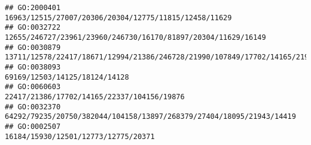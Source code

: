 \documentclass[
]{article}
\begin{document}
\begin{verbatim}
## GO:2000401                                                                                                                                                                                                                                                                                                                                                        16963/12515/27007/20306/20304/12775/11815/12458/11629
## GO:0032722                                                                                                                                                                                                                                                                                                                                                12655/246727/23961/23960/246730/16170/81897/20304/11629/16149
## GO:0030879                                                                                                                                                                                                                                                                                                                 13711/12578/22417/18671/12994/21386/246728/21990/107849/17702/14165/21943/22337/104156/19876
## GO:0038093                                                                                                                                                                                                                                                                                                                                                                                69169/12503/14125/18124/14128
## GO:0060603                                                                                                                                                                                                                                                                                                                                                                   22417/21386/17702/14165/22337/104156/19876
## GO:0032370                                                                                                                                                                                                                                                                                                                                         64292/79235/20750/382044/104158/13897/268379/27404/18095/21943/14419
## GO:0002507                                                                                                                                                                                                                                                                                                                                                                          16184/15930/12501/12773/12775/20371

\end{verbatim}
\end{document}
